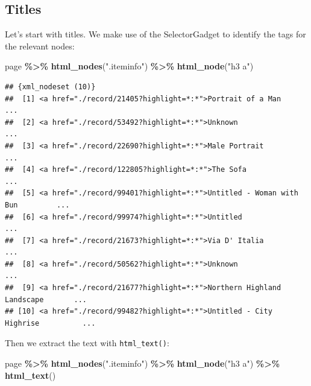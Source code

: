 \documentclass[
]{article}
\newenvironment{Shaded}{\begin{snugshade}}{\end{snugshade}}
\newcommand{\FunctionTok}[1]{\textcolor[rgb]{0.13,0.29,0.53}{\textbf{#1}}}
\newcommand{\NormalTok}[1]{#1}
\newcommand{\SpecialCharTok}[1]{\textcolor[rgb]{0.81,0.36,0.00}{\textbf{#1}}}
\newcommand{\StringTok}[1]{\textcolor[rgb]{0.31,0.60,0.02}{#1}}
\begin{document}
\subsection{Titles}\label{titles}

Let's start with titles. We make use of the SelectorGadget to identify
the tags for the relevant nodes:

\begin{Shaded}
\begin{Highlighting}[]
\NormalTok{page }\SpecialCharTok{\%\textgreater{}\%}
  \FunctionTok{html\_nodes}\NormalTok{(}\StringTok{".iteminfo"}\NormalTok{) }\SpecialCharTok{\%\textgreater{}\%}
  \FunctionTok{html\_node}\NormalTok{(}\StringTok{"h3 a"}\NormalTok{)}
\end{Highlighting}
\end{Shaded}

\begin{verbatim}
## {xml_nodeset (10)}
##  [1] <a href="./record/21405?highlight=*:*">Portrait of a Man                 ...
##  [2] <a href="./record/53492?highlight=*:*">Unknown                           ...
##  [3] <a href="./record/22690?highlight=*:*">Male Portrait                     ...
##  [4] <a href="./record/122805?highlight=*:*">The Sofa                         ...
##  [5] <a href="./record/99401?highlight=*:*">Untitled - Woman with Bun         ...
##  [6] <a href="./record/99974?highlight=*:*">Untitled                          ...
##  [7] <a href="./record/21673?highlight=*:*">Via D' Italia                     ...
##  [8] <a href="./record/50562?highlight=*:*">Unknown                           ...
##  [9] <a href="./record/21677?highlight=*:*">Northern Highland Landscape       ...
## [10] <a href="./record/99482?highlight=*:*">Untitled - City Highrise          ...
\end{verbatim}

Then we extract the text with \texttt{html\_text()}:

\begin{Shaded}
\begin{Highlighting}[]
\NormalTok{page }\SpecialCharTok{\%\textgreater{}\%}
  \FunctionTok{html\_nodes}\NormalTok{(}\StringTok{".iteminfo"}\NormalTok{) }\SpecialCharTok{\%\textgreater{}\%}
  \FunctionTok{html\_node}\NormalTok{(}\StringTok{"h3 a"}\NormalTok{) }\SpecialCharTok{\%\textgreater{}\%}
  \FunctionTok{html\_text}\NormalTok{()}
\end{Highlighting}
\end{Shaded}
\end{document}
